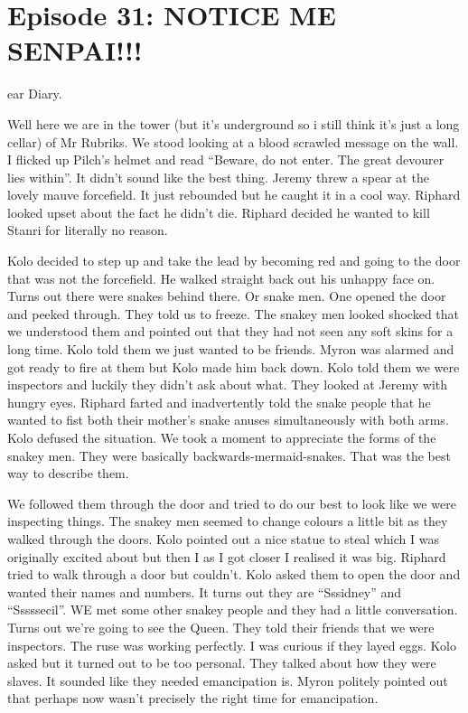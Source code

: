 \section{Episode 31: NOTICE ME SENPAI!!!}

\medskip

ear Diary.\medskip

Well here we are in the tower (but it’s underground so i still think it’s just a long cellar) of Mr Rubriks. We stood looking at a blood scrawled message on the wall. I flicked up Pilch’s helmet and read “Beware, do not enter. The great devourer lies within”. It didn’t sound like the best thing. Jeremy threw a spear at the lovely mauve forcefield. It just rebounded but he caught it in a cool way. Riphard looked upset about the fact he didn’t die. Riphard decided he wanted to kill Stanri for literally no reason.\medskip

Kolo decided to step up and take the lead by becoming red and going to the door that was not the forcefield. He walked straight back out his unhappy face on. Turns out there were snakes behind there. Or snake men. One opened the door and peeked through. They told us to freeze. The snakey men looked shocked that we understood them and pointed out that they had not seen any soft skins for a long time. Kolo told them we just wanted to be friends. Myron was alarmed and got ready to fire at them but Kolo made him back down. Kolo told them we were inspectors and luckily they didn’t ask about what. They looked at Jeremy with hungry eyes. Riphard farted and inadvertently told the snake people that he wanted to fist both their mother’s snake anuses simultaneously with both arms. Kolo defused the situation. We took a moment to appreciate the forms of the snakey men. They were basically backwards-mermaid-snakes. That was the best way to describe them.\medskip

We followed them through the door and tried to do our best to look like we were inspecting things. The snakey men seemed to change colours a little bit as they walked through the doors. Kolo pointed out a nice statue to steal which I was originally excited about but then I as I got closer I realised it was big. Riphard tried to walk through a door but couldn’t. Kolo asked them to open the door and wanted their names and numbers. It turns out they are “Sssidney” and “Sssssecil”. WE met some other snakey people and they had a little conversation. Turns out we’re going to see the Queen. They told their friends that we were inspectors. The ruse was working perfectly. I was curious if they layed eggs. Kolo asked but it turned out to be too personal. They talked about how they were slaves. It sounded like they needed emancipation is. Myron politely pointed out that perhaps now wasn’t precisely the right time for emancipation.\medskip

